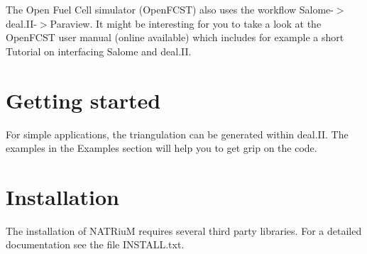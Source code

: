 The Open Fuel Cell simulator (Open\-F\-C\-S\-T) also uses the workflow Salome-\/$>$deal.\-I\-I-\/$>$Paraview. It might be interesting for you to take a look at the Open\-F\-C\-S\-T user manual (online available) which includes for example a short Tutorial on interfacing Salome and deal.\-I\-I.\hypertarget{index_start_sec}{}\section{Getting started}\label{index_start_sec}
For simple applications, the triangulation can be generated within deal.\-I\-I. The examples in the Examples section will help you to get grip on the code.\hypertarget{index_install_sec}{}\section{Installation}\label{index_install_sec}
The installation of N\-A\-T\-Riu\-M requires several third party libraries. For a detailed documentation see the file I\-N\-S\-T\-A\-L\-L.\-txt. 